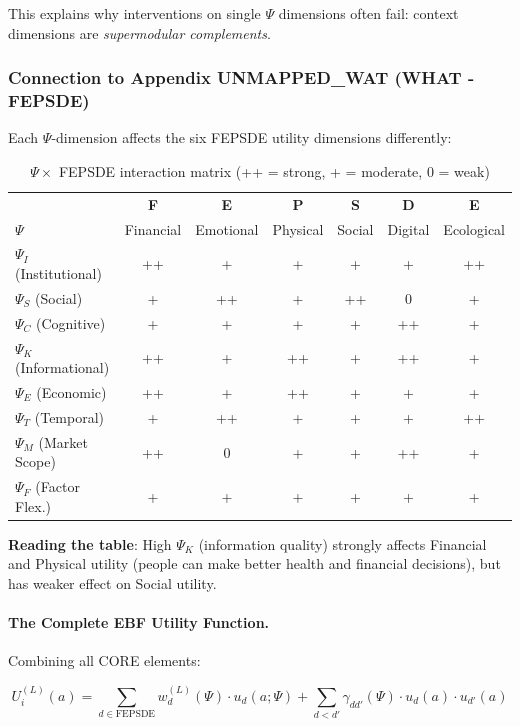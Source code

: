 This explains why interventions on single $\Psi$ dimensions often fail: 
context dimensions are \textit{supermodular complements}.

\subsubsection{Connection to Appendix UNMAPPED_WAT (WHAT - FEPSDE)}

Each $\Psi$-dimension affects the six FEPSDE utility dimensions differently:

\begin{table}[h]
\centering
\small
\begin{tabular}{l|cccccc}
\toprule
& \textbf{F} & \textbf{E} & \textbf{P} & \textbf{S} & \textbf{D} & \textbf{E} \\
$\Psi$ & Financial & Emotional & Physical & Social & Digital & Ecological \\
\midrule
$\Psi_I$ (Institutional) & ++ & + & + & + & + & ++ \\
$\Psi_S$ (Social) & + & ++ & + & ++ & 0 & + \\
$\Psi_C$ (Cognitive) & + & + & + & + & ++ & + \\
$\Psi_K$ (Informational) & ++ & + & ++ & + & ++ & + \\
$\Psi_E$ (Economic) & ++ & + & ++ & + & + & + \\
$\Psi_T$ (Temporal) & + & ++ & + & + & + & ++ \\
$\Psi_M$ (Market Scope) & ++ & 0 & + & + & ++ & + \\
$\Psi_F$ (Factor Flex.) & + & + & + & + & + & + \\
\bottomrule
\end{tabular}
\caption{$\Psi \times$ FEPSDE interaction matrix (++ = strong, + = moderate, 0 = weak)}
\label{tab:psi-fepsde}
\end{table}

\textbf{Reading the table}: High $\Psi_K$ (information quality) strongly affects 
Financial and Physical utility (people can make better health and financial 
decisions), but has weaker effect on Social utility.

\paragraph{The Complete EBF Utility Function.}

Combining all CORE elements:

\begin{equation}
U_i^{(L)}(a) = \sum_{d \in \text{FEPSDE}} w_d^{(L)}(\Psi) \cdot u_d(a; \Psi) + 
\sum_{d < d'} \gamma_{dd'}(\Psi) \cdot u_d(a) \cdot u_{d'}(a)
\label{eq:complete-utility}
\end{equation}

